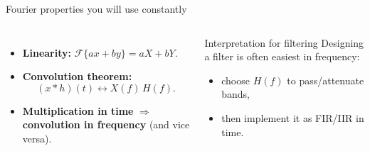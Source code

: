 \documentclass[aspectratio=169]{beamer}
\begin{document}
\begin{frame}{Fourier properties you will use constantly}
\small
\begin{columns}[T,onlytextwidth]
\begin{itemize}
  \item \textbf{Linearity:} $\mathcal{F}\{a x + b y\}= aX+bY$.
  \item \textbf{Convolution theorem:}
  \[
  (x*h)(t) \leftrightarrow X(f)\,H(f).
  \]
  \item \textbf{Multiplication in time} $\Rightarrow$ \textbf{convolution in frequency} (and vice versa).
\end{itemize}
\begin{block}{Interpretation for filtering}
Designing a filter is often easiest in frequency:
\begin{itemize}
  \item choose $H(f)$ to pass/attenuate bands,
  \item then implement it as FIR/IIR in time.
\end{itemize}
\end{block}
\end{columns}
\end{frame}
\end{document}
